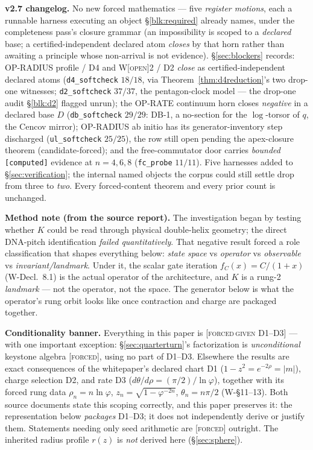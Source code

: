 \documentclass[11pt]{article}
\newcommand{\tagF}{\textcolor{cF}{\textsc{[forced]}}}
\newcommand{\tagFD}{\textcolor{cF}{\textsc{[forced}}\,\textcolor{cD}{\textsc{given D1--D3]}}}
\newcommand{\tagO}{\textcolor{cO}{\textsc{[open]}}}
\newcommand{\gp}{\varphi}
\theoremstyle{plain}
\theoremstyle{definition}
\theoremstyle{remark}
\begin{document}
\smallskip\noindent
\textbf{v2.7 changelog.} No new forced mathematics --- five \emph{register motions},
each a runnable harness executing an object \S\ref{blk:required} already names,
under the completeness pass's closure grammar (an impossibility is scoped to a
\emph{declared} base; a certified-independent declared atom \emph{closes} by that
horn rather than awaiting a principle whose non-arrival is not evidence).
\S\ref{sec:blockers} records: OP-RADIUS profile / D4 and W\tagO{}2 / D2 \emph{close}
as certified-independent declared atoms (\texttt{d4\_softcheck} $18/18$, via
Theorem~\ref{thm:d4reduction}'s two drop-one witnesses; \texttt{d2\_softcheck}
$37/37$, the pentagon-clock model --- the drop-one audit \S\ref{blk:d2} flagged
unrun); the OP-RATE continuum horn closes \emph{negative} in a declared base $D$
(\texttt{db\_softcheck} $29/29$: \textsc{DB-1}, a no-section for the $\log$-torsor
of $q$, the Cencov mirror); OP-RADIUS ab initio has its generator-inventory
step discharged (\texttt{ul\_softcheck} $25/25$), the row still open pending the
apex-closure theorem (candidate-forced); and the free-commutator door carries
\emph{bounded} \texttt{[computed]} evidence at $n=4,6,8$ (\texttt{fc\_probe}
$11/11$). Five harnesses added to \S\ref{sec:verification}; the internal named
objects the corpus could still settle drop from three to \emph{two}. Every
forced-content theorem and every prior count is unchanged.

\smallskip\noindent
\textbf{Method note (from the source report).} The investigation began by
testing whether $K$ could be read through physical double-helix geometry; the
direct DNA-pitch identification \emph{failed quantitatively}. That negative
result forced a role classification that shapes everything below:
\emph{state space} vs \emph{operator} vs \emph{observable} vs
\emph{invariant/landmark}. Under it, the scalar gate iteration
$f_C(x)=C/(1+x)$ (W-Decl.\ 8.1) is the actual operator of the architecture,
and $K$ is a rung-2 \emph{landmark} --- not the operator, not the space. The
generator below is what the operator's rung orbit looks like once contraction
and charge are packaged together.

\smallskip\noindent
\textbf{Conditionality banner.} Everything in this paper is
\tagFD{} --- with one important exception: \S\ref{sec:quarterturn}'s
factorization is \emph{unconditional} keystone algebra \tagF{}, using no part of
D1--D3. Elsewhere the results are exact consequences of the whitepaper's declared chart D1
($1-z^2=e^{-2\rho}=|m|$), charge selection D2, and rate D3
($d\theta/d\rho=(\pi/2)/\ln\gp$), together with its forced rung data
$\rho_n=n\ln\gp$, $z_n=\sqrt{1-\gp^{-2n}}$, $\theta_n=n\pi/2$ (W-\S11--13). Both
source documents state this scoping correctly, and this paper preserves it: the
representation below \emph{packages} D1--D3; it does not independently derive or
justify them. Statements needing only seed arithmetic are \tagF{} outright.
The inherited radius profile $r(z)$ is \emph{not} derived here (\S\ref{sec:sphere}).
\end{document}
